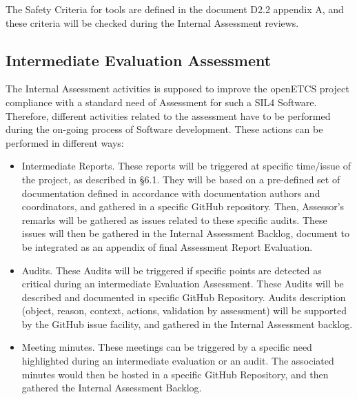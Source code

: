 \documentclass{template/openetcs_article}
\begin{document}
The Safety Criteria for tools are defined in the document D2.2 appendix A, and these criteria will be checked during the Internal Assessment reviews. 

\subsection{Intermediate Evaluation Assessment}
The Internal Assessment activities is supposed to improve the openETCS project compliance with a standard need of Assessment for such a SIL4 Software.
Therefore, different activities related to the assessment have to be performed during the on-going process of Software development. These actions can be
performed in different ways:
\begin{itemize}
\item Intermediate Reports. These reports will be triggered at specific time/issue of the project, as described in §6.1. They will be based on a pre-defined set
of documentation defined in accordance with documentation authors and coordinators, and gathered in a specific GitHub repository. Then, Assessor's remarks will
be gathered as issues related to these specific audits. These issues will then be gathered in the Internal Assessment Backlog, document to be integrated as an
appendix of final Assessment Report Evaluation.
\item Audits. These Audits will be triggered if specific points are detected as critical during an intermediate Evaluation Assessment. These Audits will be
described and documented in specific GitHub Repository. Audits description (object, reason, context, actions, validation by assessment) will be supported by the
GitHub issue facility, and gathered in the Internal Assessment backlog.
\item Meeting minutes. These meetings can be triggered by a specific need highlighted during an intermediate evaluation or an audit. The associated minutes
would then be hosted in a specific GitHub Repository, and then gathered the Internal Assessment Backlog.
\end{itemize}
\end{document}
